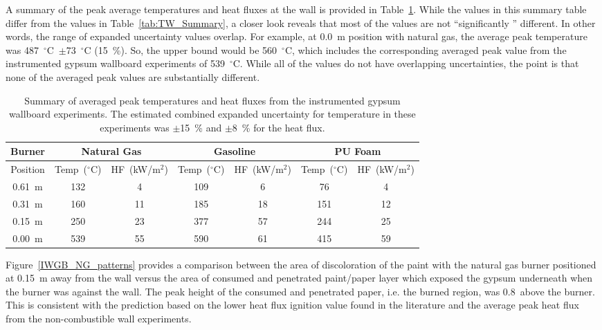 \documentclass[twoside]{uocthesis}
\begin{document}
{A summary of the peak average temperatures and heat fluxes at the wall is provided in Table~\ref{tab:IWGB_Summary}. While the values in this summary table differ from the values in Table~\ref{tab:TW_Summary}, a closer look reveals that most of the values are not ``significantly '' different.  In other words, the range of expanded uncertainty values overlap.  For example, at 0.0~m position with natural gas, the average peak temperature was 487~$^\circ$C~$\pm$73~$^\circ$C (15~\%). So, the upper bound would be 560~$^\circ$C, which includes the corresponding averaged peak value from the instrumented gypsum wallboard experiments of 539~$^\circ$C.  While all of the values do not have overlapping uncertainties, the point is that none of the averaged peak values are substantially different.        

\begin{table}
	\centering
	\scriptsize
	\begin{tabular}{|c|c|c|c|c|c|c|}
		\hline {Burner} & \multicolumn{2}{c}{Natural Gas} & \multicolumn{2}{c}{Gasoline} & \multicolumn{2}{c|}{PU Foam} \\
		\hline  Position & Temp~($^\circ$C) & HF~(kW/m$^{2}$) & Temp~($^\circ$C) & HF~(kW/m$^{2}$) & Temp~($^\circ$C) & HF~(kW/m$^{2}$) 	\\
		\hline \hline 0.61~m & 132 & 4 & 109 & 6 & 76 & 4 \\
		\hline 0.31~m & 160 & 11 & 185 & 18 & 151 & 12	\\
		\hline 0.15~m & 250 & 23 & 377 & 57 & 244 & 25	\\
		\hline 0.00~m & 539 & 55 & 590 & 61 & 415 & 59 	\\
		\hline
	\end{tabular}
	\caption[Summary of instrumented gypsum wallboard experiments]{Summary of averaged peak temperatures and heat fluxes from the instrumented gypsum wallboard experiments.  The estimated combined expanded uncertainty for temperature in these experiments was $\pm$15~\% and $\pm$8~\% for the heat flux.} 
	\label{tab:IWGB_Summary}
\end{table}

Figure~\ref{IWGB_NG_patterns} provides a comparison between the area of discoloration of the paint with the natural gas burner positioned at 0.15~m away from the wall versus the area of consumed and penetrated paint/paper layer which exposed the gypsum underneath when the burner was against the wall. The peak height of the consumed and penetrated paper, i.e. the burned region, was 0.8~above the burner.  This is consistent with the prediction based on the lower heat flux ignition value found in the literature and the average peak heat flux from the non-combustible wall experiments. 

}
\end{document}
